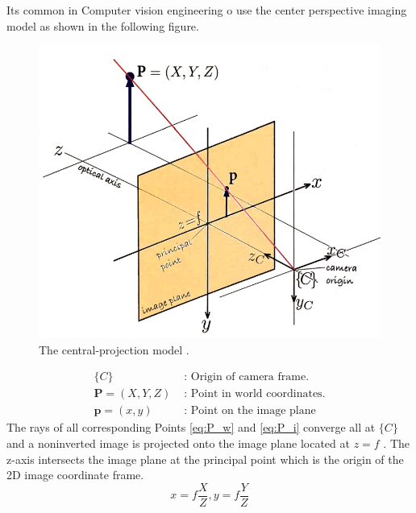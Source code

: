 \documentclass[journal,final,a4paper,twoside]{PS}
\begin{document}
Its common in Computer vision engineering o use the center perspective imaging model  as shown in the following figure.
\\
\begin{figure}[h]
\begin{center}
\includegraphics[scale=0.5]{./pics/CenterProjectionModel.png}
\caption{The central-projection model \cite{Corke}.}
\label{fig:projectionModel}
\end{center}
\end{figure}
\begin{subequations}
\begin{align}
\{C\}&\text{ : Origin of camera frame.}\label{eq:C_origin}\\
\textbf{P}=\left( X,Y,Z\right)&\text{ : Point in world coordinates.}\label{eq:P_w}\\
\textbf{p}=(x,y)&\text{ : Point on the image plane}\label{eq:P_i}
\end{align}
\end{subequations}
The rays of all corresponding Points \ref{eq:P_w} and \ref{eq:P_i} converge all at $\{C\}$ and a noninverted image is projected onto the image plane located at $z=f$ \cite{Ma:2010}. The z-axis intersects the image plane at the principal point which is the origin of the 2D image coordinate frame.
\begin{equation}
x=f\frac{X}{Z}, y=f\frac{Y}{Z}
\end{equation}
\end{document}
